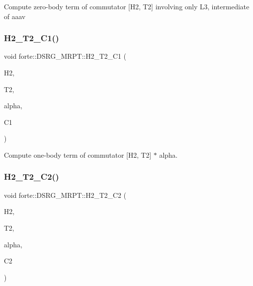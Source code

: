 Compute zero-\/body term of commutator \mbox{[}H2, T2\mbox{]} involving only L3, intermediate of aaav \mbox{\label{classforte_1_1_d_s_r_g___m_r_p_t_ab025b7eb9df9fdad69a3de7dca43ac9b}} 
\subsubsection{\texorpdfstring{H2\+\_\+\+T2\+\_\+\+C1()}{H2\_T2\_C1()}}
{\footnotesize\ttfamily void forte\+::\+D\+S\+R\+G\+\_\+\+M\+R\+P\+T\+::\+H2\+\_\+\+T2\+\_\+\+C1 (\begin{DoxyParamCaption}\item[{Blocked\+Tensor \&}]{H2,  }\item[{Blocked\+Tensor \&}]{T2,  }\item[{const double \&}]{alpha,  }\item[{Blocked\+Tensor \&}]{C1 }\end{DoxyParamCaption})\hspace{0.3cm}{\ttfamily [protected]}}



Compute one-\/body term of commutator \mbox{[}H2, T2\mbox{]} $\ast$ alpha. 

\mbox{\label{classforte_1_1_d_s_r_g___m_r_p_t_a9cd4ca67158a2be41a836acc82236640}} 
\subsubsection{\texorpdfstring{H2\+\_\+\+T2\+\_\+\+C2()}{H2\_T2\_C2()}}
{\footnotesize\ttfamily void forte\+::\+D\+S\+R\+G\+\_\+\+M\+R\+P\+T\+::\+H2\+\_\+\+T2\+\_\+\+C2 (\begin{DoxyParamCaption}\item[{Blocked\+Tensor \&}]{H2,  }\item[{Blocked\+Tensor \&}]{T2,  }\item[{const double \&}]{alpha,  }\item[{Blocked\+Tensor \&}]{C2 }\end{DoxyParamCaption})\hspace{0.3cm}{\ttfamily [protected]}}



